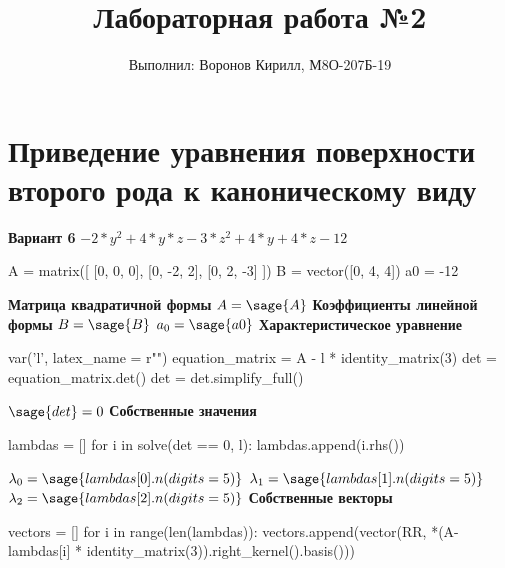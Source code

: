 \documentclass[14pt, a4paper]{extarticle}
\title{Лабораторная работа №2}
\author{Выполнил: Воронов Кирилл, М8О-207Б-19}
\begin{document}

\setcounter{page}{2} %
\tableofcontents  %
\section{Приведение уравнения поверхности второго рода к каноническому виду}
\textbf{Вариант 6}
\newline
$-2*y^2 + 4*y*z - 3*z^2 + 4*y + 4*z - 12$
\newline
\begin{sagesilent}
A = matrix([
    [0, 0, 0],
    [0, -2, 2],
    [0, 2, -3]
])
B = vector([0, 4, 4])
a0 = -12
\end{sagesilent}
\newline
\textbf{Матрица квадратичной формы}
\newline
$A = \sage{A}$
\newline
\newline
\textbf{Коэффициенты линейной формы}
\newline
$B = \sage{B}$
\newline
$a_0 = \sage{a0}$
\newline
\newline
\textbf{Характеристическое уравнение}
\begin{sagesilent}
var('l', latex_name = r"\lambda")
equation_matrix = A - l * identity_matrix(3)
det = equation_matrix.det()
det = det.simplify_full()
\end{sagesilent}
\newline
$\sage{det} = 0$
\newline
\newline
\textbf{Собственные значения}
\begin{sagesilent}
lambdas = []
for i in solve(det == 0, l):
    lambdas.append(i.rhs())
\end{sagesilent}
\newline
$\lambda_{0} = \sage{lambdas[0].n(digits = 5)}$
\newline
$\lambda_{1} = \sage{lambdas[1].n(digits = 5)}$
\newline
$\lambda_{2} = \sage{lambdas[2].n(digits = 5)}$
\newline
\newline
\textbf{Собственные векторы}
\newline
\begin{sagesilent}
vectors = []
for i in range(len(lambdas)):
    vectors.append(vector(RR, *(A-lambdas[i] * identity_matrix(3)).right_kernel().basis()))
\end{sagesilent}
\end{document}
